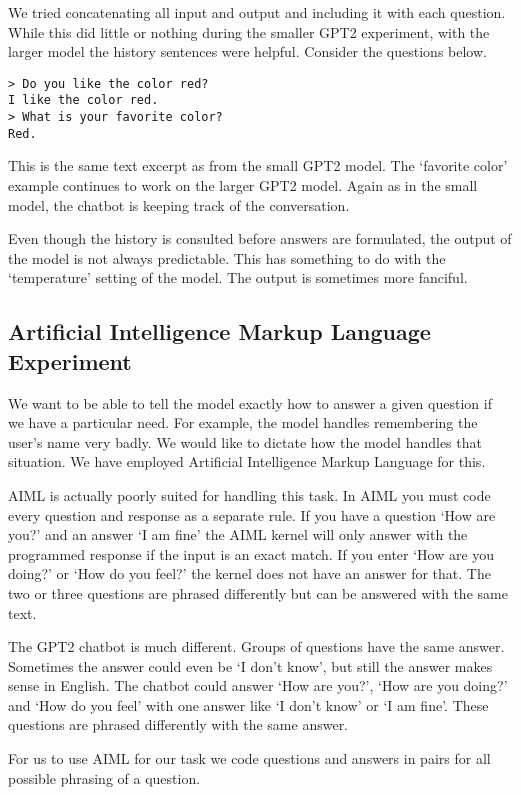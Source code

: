 We tried concatenating all input and output and including it with each question. While this did little or nothing during the smaller GPT2 experiment, with the larger model the history sentences were helpful. Consider the questions below.
\begin{verbatim}
> Do you like the color red?
I like the color red.
> What is your favorite color?
Red.
\end{verbatim}
This is the same text excerpt as from the small GPT2 model. The `favorite color' example continues to work on the larger GPT2 model. Again as in the small model, the chatbot is keeping track of the conversation. 

Even though the history is consulted before answers are formulated, the output of the model is not always predictable. This has something to do with the `temperature' setting of the model. The output is sometimes more fanciful.


\subsection{Artificial Intelligence Markup Language Experiment}

We want to be able to tell the model exactly how to answer a given question if we have a particular need. For example, the model handles remembering the user's name very badly. We would like to dictate how the model handles that situation. We have employed Artificial Intelligence Markup Language for this. 

AIML is actually poorly suited for handling this task. In AIML you must code every question and response as a separate rule. If you have a question `How are you?' and an answer `I am fine' the AIML kernel will only answer with the programmed response if the input is an exact match. If you enter `How are you doing?' or `How do you feel?' the kernel does not have an answer for that. The two or three questions are phrased differently but can be answered with the same text.

The GPT2 chatbot is much different. Groups of questions have the same answer. Sometimes the answer could even be `I don't know', but still the answer makes sense in English. The chatbot could answer `How are you?', `How are you doing?' and `How do you feel' with one answer like `I don't know' or `I am fine'. These questions are phrased differently with the same answer.

For us to use AIML for our task we code questions and answers in pairs for all possible phrasing of a question.

